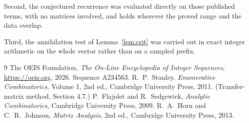 \documentclass[11pt,a4paper]{article}
\theoremstyle{plain}
\theoremstyle{definition}
\begin{document}
Second, the conjectured recurrence was evaluated directly on those published terms, with no
matrices involved, and holds wherever the proved range and the data overlap.

Third, the annihilation test of Lemma~\ref{lem:crit} was carried out in exact integer
arithmetic on the whole vector rather than on a sampled prefix.

\begin{thebibliography}{9}
 The OEIS Foundation, \emph{The On-Line Encyclopedia of Integer
Sequences}, \url{https://oeis.org}, 2026. Sequence A234563.
 R.~P.~Stanley, \emph{Enumerative Combinatorics}, Volume 1, 2nd ed.,
Cambridge University Press, 2011. (Transfer-matrix method, Section 4.7.)
 P.~Flajolet and R.~Sedgewick, \emph{Analytic Combinatorics}, Cambridge
University Press, 2009.
 R.~A.~Horn and C.~R.~Johnson, \emph{Matrix Analysis}, 2nd ed., Cambridge
University Press, 2013.
\end{thebibliography}
\end{document}
